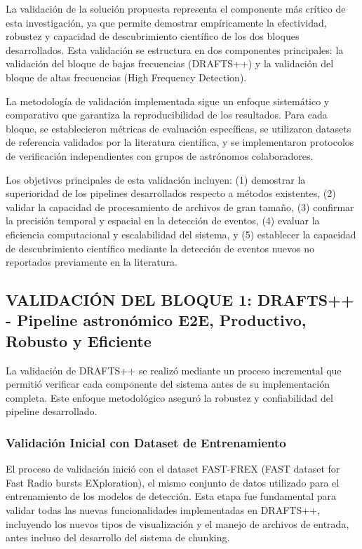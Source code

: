 
La validación de la solución propuesta representa el componente más crítico de esta investigación, ya que permite demostrar empíricamente la efectividad, robustez y capacidad de descubrimiento científico de los dos bloques desarrollados. Esta validación se estructura en dos componentes principales: la validación del bloque de bajas frecuencias (DRAFTS++) y la validación del bloque de altas frecuencias (High Frequency Detection).

La metodología de validación implementada sigue un enfoque sistemático y comparativo que garantiza la reproducibilidad de los resultados. Para cada bloque, se establecieron métricas de evaluación específicas, se utilizaron datasets de referencia validados por la literatura científica, y se implementaron protocolos de verificación independientes con grupos de astrónomos colaboradores.

Los objetivos principales de esta validación incluyen: (1) demostrar la superioridad de los pipelines desarrollados respecto a métodos existentes, (2) validar la capacidad de procesamiento de archivos de gran tamaño, (3) confirmar la precisión temporal y espacial en la detección de eventos, (4) evaluar la eficiencia computacional y escalabilidad del sistema, y (5) establecer la capacidad de descubrimiento científico mediante la detección de eventos nuevos no reportados previamente en la literatura.

\subsection{VALIDACIÓN DEL BLOQUE 1: DRAFTS++ - Pipeline astronómico E2E, Productivo, Robusto y Eficiente}

La validación de DRAFTS++ se realizó mediante un proceso incremental que permitió verificar cada componente del sistema antes de su implementación completa. Este enfoque metodológico aseguró la robustez y confiabilidad del pipeline desarrollado.

\subsubsection{Validación Inicial con Dataset de Entrenamiento}

El proceso de validación inició con el dataset FAST-FREX (FAST dataset for Fast Radio bursts EXploration), el mismo conjunto de datos utilizado para el entrenamiento de los modelos de detección. Esta etapa fue fundamental para validar todas las nuevas funcionalidades implementadas en DRAFTS++, incluyendo los nuevos tipos de visualización y el manejo de archivos de entrada, antes incluso del desarrollo del sistema de chunking.

